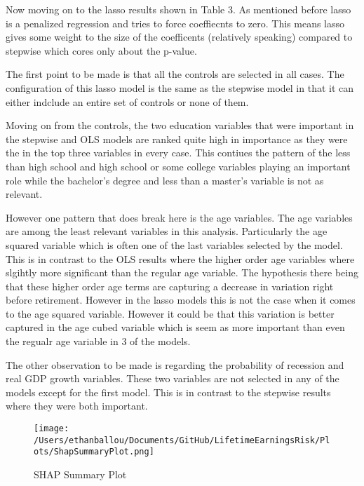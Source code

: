 \documentclass[12pt]{article}
\begin{document}
\begin{onehalfspace}



Now moving on to the lasso results shown in Table 3. As mentioned before lasso is a penalized regression and tries to force coeffiecnts to zero. This means lasso gives some weight to the size of the coefficents (relatively speaking) compared to stepwise which cores only about the p-value. 

The first point to be made is that all the controls are selected in all cases. The configuration of this lasso model is the same as the stepwise model in that it can either indclude an entire set of controls or none of them. 

Moving on from the controls, the two education variables that were important in the stepwise and OLS models are ranked quite high in importance as they were the in the top three variables in every case. This contiues the pattern of the less than high school and high school or some college variables playing an important role while the bachelor's degree and less than a master's variable is not as relevant. 

However one pattern that does break here is the age variables. The age variables are among the least relevant variables in this analysis. Particularly the age squared variable which is often one of the last variables selected by the model. This is in contrast to the OLS results where the higher order age variables where slgihtly more significant than the regular age variable. The hypothesis there being that these higher order age terms are capturing a decrease in variation right before retirement. However in the lasso models this is not the case when it comes to the age squared variable. However it could be that this variation is better captured in the age cubed variable which is seem as more important than even the regualr age variable in 3 of the models.

The other observation to be made is regarding the probability of recession and real GDP growth variables. These two variables are not selected in any of the models except for the first model. This is in contrast to the stepwise results where they were both important. 



\begin{figure}[H]
    \centering
    \texttt{[image: /Users/ethanballou/Documents/GitHub/LifetimeEarningsRisk/Plots/ShapSummaryPlot.png]}
    \caption{SHAP Summary Plot}
\end{figure}




\end{onehalfspace}
\end{document}
